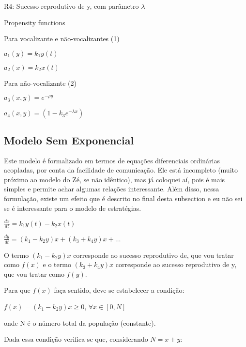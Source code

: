 R4: Sucesso reprodutivo de y, com parâmetro $\lambda$

\vspace{3 mm}
Propensity functions

\vspace{3 mm}
Para vocalizante e não-vocalizantes (1)

\vspace{3 mm}
$a_1(y)=k_1 y(t)$

\vspace{3 mm}
$a_2(x)=k_2 x(t)$

\vspace{3 mm}
Para não-vocalizante (2)

\vspace{3 mm}
$a_3(x,y)=e^{-\rho y}$

\vspace{3 mm}
$a_4(x,y)=(1-k_3 e^{-\lambda x})$


\subsection{Modelo Sem Exponencial}
Este modelo é formalizado em termos de equações diferenciais ordinárias acopladas, por conta da facilidade de comunicação. Ele está incompleto (muito próximo ao modelo do Zé, se não idêntico), mas já coloquei aí, pois é mais simples e permite achar algumas relações interessante. Além disso, nessa formulação, existe um efeito que é descrito no final desta subsection e eu não sei se é interessante para o modelo de estratégias.

\vspace{3 mm}
$\frac{dx}{dt} = k_1 y(t) -k_2 x(t)$

\vspace{3 mm}
$\frac{dy}{dt} = (k_1 - k_2 y)x + (k_3 + k_4 y)x + \ldots$

\vspace{3 mm}
O termo $(k_1 - k_2 y)x$ corresponde ao sucesso reprodutivo de, que vou tratar como $f(x)$ e o termo $(k_3 + k_4 y)x$ corresponde ao sucesso reprodutivo de y, que vou tratar como $f(y)$.

Para que $f(x)$ faça sentido, deve-se estabelecer a condição:

\vspace{3 mm}
$f(x)=(k_1 - k_2 y)x \geq 0$, $\forall x \in [0,N]$

onde N é o número total da população (constante).

\vspace{3 mm}
Dada essa condição verifica-se que, considerando $N=x+y$:

